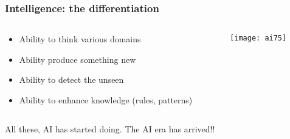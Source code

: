 \begin{frame}[fragile]\frametitle{ Intelligence: the differentiation}

\begin{columns}
    \begin{column}[T]{0.6\linewidth}

\begin{itemize}
\item Ability to think various domains
\item Ability produce something new
\item Ability to detect the unseen
\item Ability to enhance knowledge (rules, patterns)
\end{itemize}

    \end{column}
    \begin{column}[T]{0.4\linewidth}

			\begin{center}
			\texttt{[image: ai75]}
			\end{center}
			
    \end{column}
  \end{columns}
  
  

All these, AI has started doing. The AI era has arrived!!
\end{frame}







